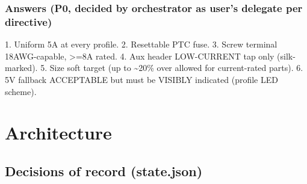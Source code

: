 \documentclass[11pt,a4paper]{article}
\begin{document}
\subsubsection*{Answers (P0, decided by orchestrator as user's delegate per directive)}
1. Uniform 5A at every profile. 2. Resettable PTC fuse. 3. Screw terminal 18AWG-capable, \textgreater{}=8A rated. 4. Aux header LOW-CURRENT tap only (silk-marked). 5. Size soft target (up to \textasciitilde{}20\% over allowed for current-rated parts). 6. 5V fallback ACCEPTABLE but must be VISIBLY indicated (profile LED scheme).

\section{Architecture}
\subsection*{Decisions of record (state.json)}
\end{document}
